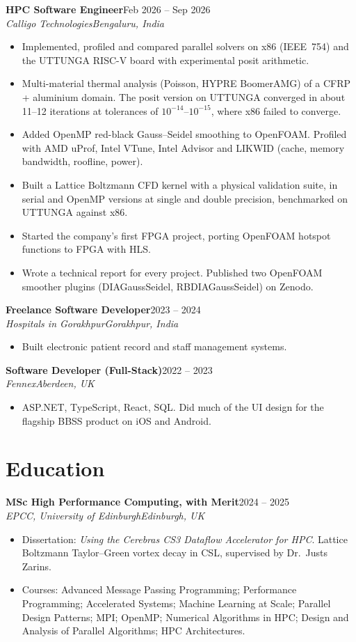 \documentclass[10pt,a4paper]{article}
\newcommand{\entry}[4]{%
  \textbf{#1}\hfill #2\\
  \textit{#3}\hfill \textit{#4}\par\vspace{2pt}}
\begin{document}
\entry{HPC Software Engineer}{Feb 2026 -- Sep 2026}
      {Calligo Technologies}{Bengaluru, India}
\begin{itemize}
  \item Implemented, profiled and compared parallel solvers on x86 (IEEE~754) and the UTTUNGA RISC-V
        board with experimental posit arithmetic.
  \item Multi-material thermal analysis (Poisson, HYPRE BoomerAMG) of a CFRP + aluminium domain. The posit
        version on UTTUNGA converged in about 11--12 iterations at tolerances of $10^{-14}$--$10^{-15}$, where x86 failed to converge.
  \item Added OpenMP red-black Gauss--Seidel smoothing to OpenFOAM. Profiled with AMD uProf, Intel VTune,
        Intel Advisor and LIKWID (cache, memory bandwidth, roofline, power).
  \item Built a Lattice Boltzmann CFD kernel with a physical validation suite, in serial and OpenMP versions at
        single and double precision, benchmarked on UTTUNGA against x86.
  \item Started the company's first FPGA project, porting OpenFOAM hotspot functions to FPGA with HLS.
  \item Wrote a technical report for every project. Published two OpenFOAM smoother plugins
        (DIAGaussSeidel, RBDIAGaussSeidel) on Zenodo.
\end{itemize}

\entry{Freelance Software Developer}{2023 -- 2024}
      {Hospitals in Gorakhpur}{Gorakhpur, India}
\begin{itemize}
  \item Built electronic patient record and staff management systems.
\end{itemize}

\entry{Software Developer (Full-Stack)}{2022 -- 2023}
      {Fennex}{Aberdeen, UK}
\begin{itemize}
  \item ASP.NET, TypeScript, React, SQL. Did much of the UI design for the flagship BBSS product on iOS and Android.
\end{itemize}

\section*{Education}

\entry{MSc High Performance Computing, with Merit}{2024 -- 2025}
      {EPCC, University of Edinburgh}{Edinburgh, UK}
\begin{itemize}
  \item Dissertation: \textit{Using the Cerebras CS3 Dataflow Accelerator for HPC}. Lattice Boltzmann
        Taylor--Green vortex decay in CSL, supervised by Dr.\ Justs Zarins.
  \item Courses: Advanced Message Passing Programming; Performance Programming; Accelerated Systems;
        Machine Learning at Scale; Parallel Design Patterns; MPI; OpenMP; Numerical Algorithms in HPC;
        Design and Analysis of Parallel Algorithms; HPC Architectures.
\end{itemize}
\end{document}
